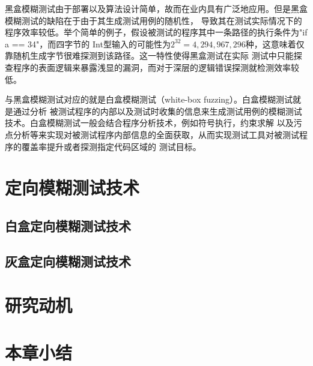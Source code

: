 \documentclass[bachelor]{njupthesis}
\begin{document}
黑盒模糊测试由于部署以及算法设计简单，故而在业内具有广泛地应用。但是黑盒模糊测试的缺陷在于由于其生成测试用例的随机性，
导致其在测试实际情况下的程序效率较低。举个简单的例子，假设被测试的程序其中一条路径的执行条件为"if a == 34"，而四字节的
Int型输入的可能性为$2^{32}=4,294,967,296$种，这意味着仅靠随机生成字节很难探测到该路径。这一特性使得黑盒测试在实际
测试中只能探查程序的表面逻辑来暴露浅显的漏洞，而对于深层的逻辑错误探测就检测效率较低。

与黑盒模糊测试对应的就是白盒模糊测试\cite{godefroid2008automated}（white-box fuzzing）。白盒模糊测试就是通过分析
被测试程序的内部以及测试时收集的信息来生成测试用例的模糊测试技术。白盒模糊测试一般会结合程序分析技术，例如符号执行，约束求解
以及污点分析等来实现对被测试程序内部信息的全面获取，从而实现测试工具对被测试程序的覆盖率提升或者探测指定代码区域的
测试目标。
\section{定向模糊测试技术}
\subsection{白盒定向模糊测试技术}
\subsection{灰盒定向模糊测试技术}
\section{研究动机}
\section{本章小结}
\end{document}
